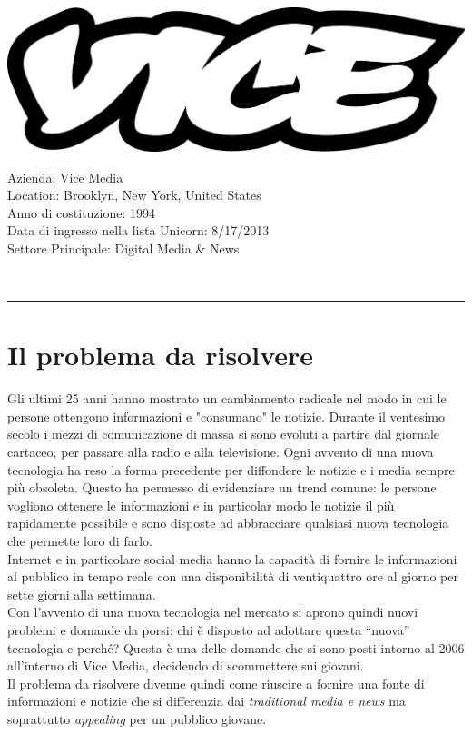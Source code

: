 \documentclass[a4paper, 11pt]{article}
\begin{document}
\newpage
\noindent
\begin{minipage}{0.3\textwidth}
\includegraphics[width=0.95 \linewidth]{images/ViceMediaLogo.png}
\end{minipage}
\hfill
\begin{minipage}{0.6\textwidth}\raggedleft
Azienda: Vice Media\\
Location: Brooklyn, New York, United States\\
Anno di costituzione: 1994 \\
Data di ingresso nella lista Unicorn: 8/17/2013 \\
Settore Principale: Digital Media \& News \\
\end{minipage}\\
\par\noindent\rule{\textwidth}{0.4pt}
\section*{Il problema da risolvere}
\par Gli ultimi 25 anni hanno mostrato un cambiamento radicale nel modo in cui le persone ottengono informazioni e "consumano" le notizie. Durante il ventesimo secolo i mezzi di comunicazione di massa si sono evoluti a partire dal giornale cartaceo, per passare alla radio e alla televisione. Ogni avvento di una nuova tecnologia ha reso la forma precedente per diffondere le notizie e i media sempre più obsoleta. Questo ha permesso di evidenziare un trend comune: le persone vogliono ottenere le informazioni e in particolar modo le notizie il più rapidamente possibile e sono disposte ad abbracciare qualsiasi nuova tecnologia che permette loro di farlo.\\
Internet e in particolare social media hanno la capacità di fornire le informazioni al pubblico in tempo reale con una disponibilità di ventiquattro ore al giorno per sette giorni alla settimana.\\
Con l’avvento di una nuova tecnologia nel mercato si aprono quindi nuovi problemi e domande da porsi: chi è disposto ad adottare questa “nuova” tecnologia e perché? Questa è una delle domande che si sono posti intorno al 2006 all’interno di Vice Media, decidendo di scommettere sui giovani.\\
Il problema da risolvere divenne quindi come riuscire a fornire una fonte di informazioni e notizie che si differenzia dai \textit{traditional media e  news} ma soprattutto \textit{appealing} per un pubblico giovane.
\end{document}
